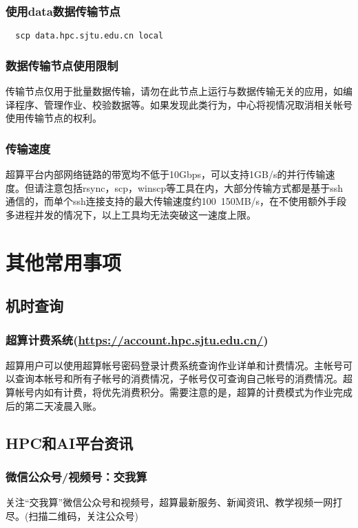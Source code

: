 \documentclass[cn, 12pt, hang, black, chinese]{elegantbook}
\begin{document}
\subsection*{使用data数据传输节点}
\begin{lstlisting}
  scp data.hpc.sjtu.edu.cn local
\end{lstlisting}

\subsection*{数据传输节点使用限制}
传输节点仅用于批量数据传输，请勿在此节点上运行与数据传输无关的应用，如编译程序、管理作业、校验数据等。如果发现此类行为，中心将视情况取消相关帐号使用传输节点的权利。

\subsection*{传输速度}

超算平台内部网络链路的带宽均不低于10Gbps，可以支持1GB/s的并行传输速度。但请注意包括rsync，scp，winscp等工具在内，大部分传输方式都是基于ssh通信的，而单个ssh连接支持的最大传输速度约100~150MB/s，在不使用额外手段多进程并发的情况下，以上工具均无法突破这一速度上限。

\chapter{其他常用事项}

\section{机时查询}
\subsection*{超算计费系统(\href{https://account.hpc.sjtu.edu.cn/}{https://account.hpc.sjtu.edu.cn/})}
超算用户可以使用超算帐号密码登录计费系统查询作业详单和计费情况。主帐号可以查询本帐号和所有子帐号的消费情况，子帐号仅可查询自己帐号的消费情况。超算帐号内如有计费，将优先消费积分。需要注意的是，超算的计费模式为作业完成后的第二天凌晨入账。

\section{HPC和AI平台资讯}
\subsection*{微信公众号/视频号：交我算}
关注“交我算”微信公众号和视频号，超算最新服务、新闻资讯、教学视频一网打尽。(扫描二维码，关注公众号)
\end{document}
